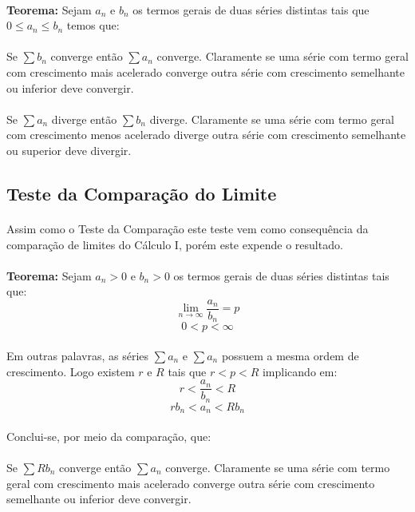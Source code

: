 \documentclass{article}
\begin{document}
        \paragraph{}\textbf{Teorema:} Sejam $a_{n}$ e $b_{n}$ os termos gerais de duas séries distintas tais que $0 \le a_{n} \le b_{n}$ temos que:
        \paragraph{}Se $\sum b_{n}$ converge então $\sum a_{n}$ converge. Claramente se uma série com termo geral com crescimento mais acelerado converge outra série com crescimento semelhante ou inferior deve convergir.
        \paragraph{}Se $\sum a_{n}$ diverge então $\sum b_{n}$ diverge. Claramente se uma série com termo geral com crescimento menos acelerado diverge outra série com crescimento semelhante ou superior deve divergir.
    \subsection{Teste da Comparação do Limite}
        \paragraph{}Assim como o Teste da Comparação este teste vem como consequência da comparação de limites do Cálculo I, porém este expende o resultado.
        \paragraph{}\textbf{Teorema:} Sejam $a_{n}>0$ e $b_{n}>0$ os termos gerais de duas séries distintas tais que:
            \[\lim_{n\to\infty}\frac{a_{n}}{b_{n}}=p\]
            \[0<p<\infty\]
        \paragraph{}Em outras palavras, as séries $\sum a_{n}$ e $\sum a_{n}$ possuem a mesma ordem de crescimento. Logo existem $r$ e $R$ tais que $r<p<R$ implicando em:
            \[r<\frac{a_{n}}{b_{n}}<R\]
            \[rb_{n}<a_{n}<Rb_{n}\]
        \paragraph{}Conclui-se, por meio da comparação, que:
        \paragraph{}Se $\sum Rb_{n}$ converge então $\sum a_{n}$ converge. Claramente se uma série com termo geral com crescimento mais acelerado converge outra série com crescimento semelhante ou inferior deve convergir.
\end{document}
